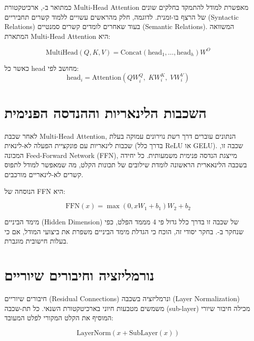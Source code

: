 כמתואר ב-\cite{devlin2019bert}, ארכיטקטורת \textenglish{Multi-Head Attention} מאפשרת למודל להתמקד בחלקים שונים של הרצף בו-זמנית. לדוגמה, חלק מהראשים עשויים ללמוד קשרים תחביריים (\textenglish{Syntactic Relations}) בעוד שאחרים לומדים קשרים סמנטיים (\textenglish{Semantic Relations}). המשוואה המתארת \textenglish{Multi-Head Attention} היא:

\begin{equation}
\text{MultiHead}(Q, K, V) = \text{Concat}(\text{head}_1, \ldots, \text{head}_h)W^O
\end{equation}

כאשר כל \textenglish{head} מחושב לפי:
\begin{equation}
\text{head}_i = \text{Attention}(QW_i^Q,\; KW_i^K,\; VW_i^V)
\end{equation}

\section{השכבות הלינאריות וההנדסה הפנימית}

לאחר שכבת \textenglish{Multi-Head Attention}, הנתונים עוברים דרך רשת נוירונים עמוקה בעלת שכבות לינאריות עם פונקציית הפעלה לא-לינאית (בדרך כלל \textenglish{ReLU} או \textenglish{GELU}). שכבה זו, המכונה \textenglish{Feed-Forward Network} (\textenglish{FFN}), מייצגת הנדסה פנימית משמעותית. כל יחידה בשכבה הלינאארית הראשונה לומדת שילובים של תכונות הקלט, מה שמאפשר למודל לתפוס קשרים לא-לינאריים מורכבים.

הנוסחה של \textenglish{FFN} היא:

\begin{equation}
\text{FFN}(x) = \max(0, xW_1 + b_1)W_2 + b_2
\end{equation}

מימד הביניים (\textenglish{Hidden Dimension}) של שכבה זו בדרך כלל גדול פי 4 מממד הפלט, כפי שנחקר ב-\cite{brown2020language}. בחקר יסודי זה, הוכח כי הגדלת מימד הביניים משפרת את ביצועי המודל, אם כי בעלות חישובית מוגברת.

\section{נורמליזציה וחיבורים שיוריים}

חיבורים שיוריים (\textenglish{Residual Connections}) ונרמליזציה בשכבה (\textenglish{Layer Normalization}) משמשים מטבעות חיוני בארכיטקטורת השנאי. כל תת-שכבה (\textenglish{sub-layer}) מכילה חיבור שיורי המוסיף את הקלט המקורי לפלט המעובד:

\begin{equation}
\text{LayerNorm}(x + \text{SubLayer}(x))
\end{equation}


